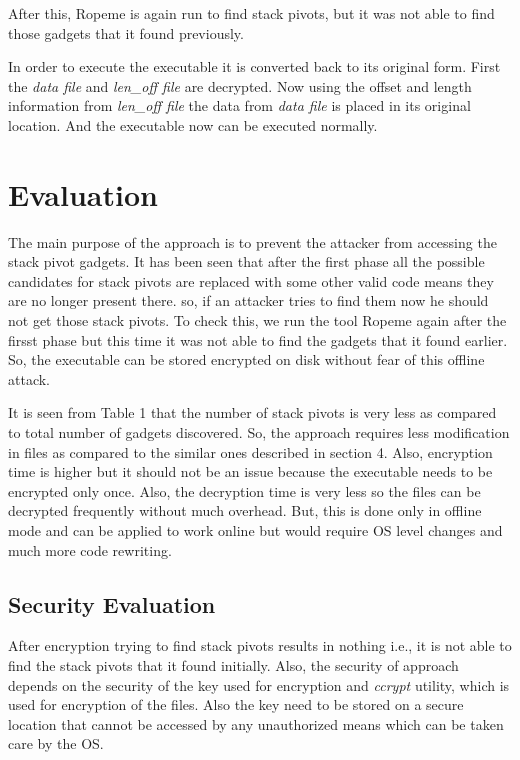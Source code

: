 \documentclass{article}
\begin{document}
\begin{multicols}{2}
	After this, Ropeme\cite{ropeme} is again run to find stack pivots, but it was not able to find those gadgets that it found previously.
	
	In order to execute the executable it is converted back to its original form. First the \textit{data file} and \textit{len\_off file} are decrypted. Now using the offset and length information from \textit{len\_off file} the data from \textit{data file} is placed in its original location. And the executable now can be executed normally.
	
	\section{Evaluation}
	The main purpose of the approach is to prevent the attacker from accessing the stack pivot gadgets. It has been seen that after the first phase all the possible candidates for stack pivots are replaced with some other valid code means they are no longer present there. so, if an attacker tries to find them now he should not get those stack pivots. To check this, we run the tool Ropeme again after the firsst phase but this time it was not able to find the gadgets that it found earlier. So, the executable can be stored encrypted on disk without fear of this offline attack.
	
	It is seen from Table 1 that the number of stack pivots is very less as compared to total number of gadgets discovered. So, the approach requires less modification in files as compared to the similar ones described in section 4. Also, encryption time is higher but it should not be an issue because the executable needs to be encrypted only once. Also, the decryption time is very less so the files can be decrypted frequently without much overhead. But, this is done only in offline mode and can be applied to work online but would require OS level changes and much more code rewriting.

	\subsection{Security Evaluation}
	After encryption trying to find stack pivots results in nothing i.e., it is not able to find the stack pivots that it found initially. Also, the security of approach depends on the security of the key used for encryption and \textit{ccrypt} utility, which is used for encryption of the files. Also the key need to be stored on a secure location that cannot be accessed by any unauthorized means which can be taken care by the OS.
\end{multicols}
\end{document}
